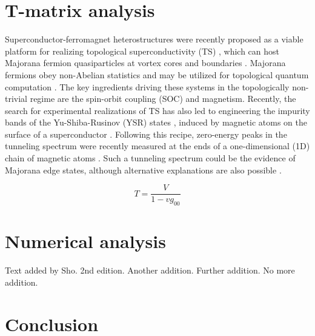 \documentclass[twocolumn,showpacs,floatfix,nofootinbib,longbibliography]{revtex4-1}
\begin{document}
\section{T-matrix analysis} \label{sec:analytics}
Superconductor-ferromagnet heterostructures were recently proposed as a viable platform for realizing topological superconductivity (TS) \cite{Lutchyn2010,Oreg2010, Sau2010}, which can host Majorana fermion quasiparticles at vortex cores and boundaries \cite{Kitaev2001, Alicea, Beenakker2013}. Majorana fermions obey non-Abelian statistics and may be utilized for topological quantum computation \cite{Read2000, Ivanov2001, Nayak2008}.  The key ingredients driving these systems in the topologically non-trivial regime are the spin-orbit coupling (SOC) and magnetism. Recently, the search for experimental realizations of TS has also led to engineering the impurity bands of the Yu-Shiba-Rusinov (YSR) states \cite{Yu,Shiba,Rusinov}, induced by magnetic atoms on the surface of a superconductor \cite{Choy2011, Nadj-Perge2013, Klinovaja2013, Vazifeh2013, Braunecker2013, Pientka2013, Nakosai2013, Poyhonen2014, Reis2014, Brydon2015, Rontynen2014, Li2015}. Following this recipe, zero-energy peaks in the tunneling spectrum were recently measured at the ends of a one-dimensional (1D) chain of magnetic atoms \cite{Yazdani2014}. Such a tunneling spectrum could be the evidence of Majorana edge states, although alternative explanations are also possible \cite{Sau2015}.




\begin{equation}
 T = \frac{V}{1-vg_{00}}
\end{equation}

\section{Numerical analysis} \label{sec:numerics}
Text added by Sho.
2nd edition. 
Another addition. 
Further addition.
No more addition.
\section{Conclusion} \label{sec:conclusion}




\newpage
%

\end{document}
